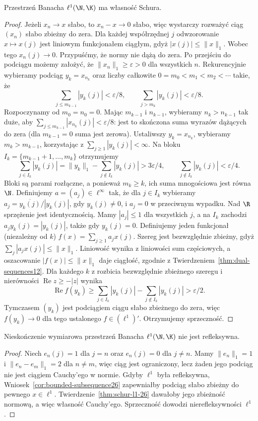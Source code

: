 \begin{twierdzenie}
\label{thm:schur-l1-26}
Przestrzeń Banacha $\ell^1(\N,\K)$ ma własność Schura.
\end{twierdzenie}
\begin{proof}
Jeżeli $x_n\to x$ słabo, to $x_n-x\to0$ słabo,
więc wystarczy rozważyć ciąg $(x_n)$ słabo zbieżny
do zera. Dla każdej współrzędnej $j$ odwzorowanie
$x\mapsto x(j)$ jest liniowym funkcjonałem ciągłym,
gdyż $|x(j)|\le\|x\|_1$. Wobec tego $x_n(j)\to0$.
Przypuśćmy, że normy nie dążą do zera. Po przejściu do
podciągu możemy założyć, że $\|x_n\|_1\ge\varepsilon>0$
dla wszystkich $n$. Rekurencyjnie wybieramy podciąg
$y_k=x_{n_k}$ oraz liczby całkowite
$0=m_0<m_1<m_2<\cdots$ takie, że
\[
\sum_{j\le m_{k-1}}|y_k(j)|<\varepsilon/8,
\qquad
\sum_{j>m_k}|y_k(j)|<\varepsilon/8.
\]
Rozpoczynamy od $m_0=n_0=0$. Mając $m_{k-1}$ i
$n_{k-1}$, wybieramy $n_k>n_{k-1}$ tak duże, aby
$\sum_{j\le m_{k-1}}|x_{n_k}(j)|<\varepsilon/8$:
jest to skończona suma wyrazów dążących do zera
(dla $m_{k-1}=0$ suma jest zerowa).
Ustaliwszy $y_k=x_{n_k}$, wybieramy
$m_k>m_{k-1}$, korzystając z
$\sum_{j\ge1}|y_k(j)|<\infty$.
Na bloku $I_k=\{m_{k-1}+1,\ldots,m_k\}$ otrzymujemy
\[
 \sum_{j\in I_k}|y_k(j)|
 =\|y_k\|_1-\sum_{j\notin I_k}|y_k(j)|
 >3\varepsilon/4,\qquad
 \sum_{j\notin I_k}|y_k(j)|<\varepsilon/4.
\]
Bloki są parami rozłączne, a ponieważ $m_k\ge k$,
ich suma mnogościowa jest równa $\N$.
Definiujemy $a=(a_j)\in\ell^\infty$ tak, że dla $j\in I_k$
wybieramy $a_j=\overline{y_k(j)}/|y_k(j)|$, gdy $y_k(j)\ne0$,
i $a_j=0$ w przeciwnym wypadku.
Nad $\R$ sprzężenie jest identycznością.
Mamy $|a_j|\le1$ dla wszystkich $j$, a na $I_k$
zachodzi $a_jy_k(j)=|y_k(j)|$, także gdy $y_k(j)=0$.
Definiujemy jeden funkcjonał (niezależny od $k$)
$f(x)=\sum_{j\ge1}a_jx(j)$. Szereg jest bezwzględnie
zbieżny, gdyż $\sum_j|a_jx(j)|\le\|x\|_1$.
Liniowość wynika z liniowości sum częściowych,
a oszacowanie $|f(x)|\le\|x\|_1$ daje ciągłość,
zgodnie z Twierdzeniem~\ref{thm:dual-sequences12}.
Dla każdego $k$ z rozbicia bezwzględnie zbieżnego
szeregu i nierówności $\operatorname{Re}z\ge-|z|$
wynika
\[
\operatorname{Re}f(y_k)\ge
\sum_{j\in I_k}|y_k(j)|-\sum_{j\notin I_k}|y_k(j)|
>\varepsilon/2.
\]
Tymczasem $(y_k)$ jest podciągiem ciągu słabo
zbieżnego do zera, więc $f(y_k)\to0$ dla tego
ustalonego $f\in(\ell^1)'$. Otrzymujemy sprzeczność.
\end{proof}

\begin{wniosek}
\label{cor:l1-nonreflexive26}
Nieskończenie wymiarowa przestrzeń Banacha $\ell^1(\N,\K)$
nie jest refleksywna.
\end{wniosek}
\begin{proof}
Niech $e_n(j)=1$ dla $j=n$ oraz $e_n(j)=0$
dla $j\ne n$. Mamy $\|e_n\|_1=1$ i
$\|e_n-e_m\|_1=2$ dla $n\ne m$, więc ciąg jest
ograniczony, lecz żaden jego podciąg nie jest
ciągiem Cauchy'ego w normie.
Gdyby $\ell^1$ była refleksywna,
Wniosek~\ref{cor:bounded-subsequence26} zapewniałby podciąg
słabo zbieżny do pewnego $x\in\ell^1$.
Twierdzenie~\ref{thm:schur-l1-26} dawałoby jego
zbieżność normową, a więc własność Cauchy'ego.
Sprzeczność dowodzi nierefleksywności $\ell^1$.
\end{proof}


